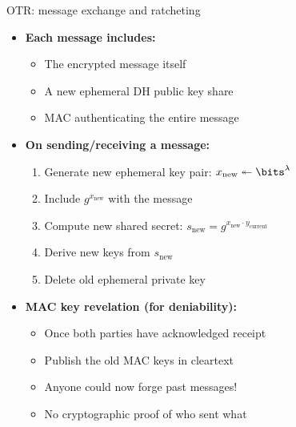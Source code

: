 \documentclass[aspectratio=169, lualatex, handout]{beamer}
\begin{document}
\begin{frame}{OTR: message exchange and ratcheting}
	\begin{itemize}
		\item \textbf{Each message includes:}
		      \begin{itemize}
			      \item The encrypted message itself
			      \item A new ephemeral DH public key share
			      \item MAC authenticating the entire message
		      \end{itemize}
		\item \textbf{On sending/receiving a message:}
		      \begin{enumerate}
			      \item Generate new ephemeral key pair: $x_{\text{new}} \twoheadleftarrow \bits^{\lambda}$
			      \item Include $g^{x_{\text{new}}}$ with the message
			      \item Compute new shared secret: $s_{\text{new}} = g^{x_{\text{new}} \cdot y_{\text{current}}}$
			      \item Derive new keys from $s_{\text{new}}$
			      \item Delete old ephemeral private key
		      \end{enumerate}
		\item \textbf{MAC key revelation (for deniability):}
		      \begin{itemize}
			      \item Once both parties have acknowledged receipt
			      \item Publish the old MAC keys in cleartext
			      \item Anyone could now forge past messages!
			      \item No cryptographic proof of who sent what
		      \end{itemize}
	\end{itemize}
\end{frame}
\end{document}
